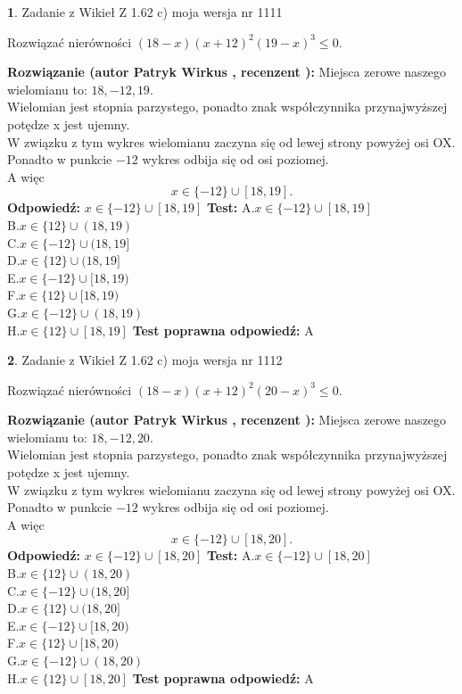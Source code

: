 \documentclass[12pt, a4paper]{article}
\theoremstyle{definition} %
\newtheorem{zad}{}
\newcommand{\zadStart}[1]{\begin{zad}#1\newline}
\newcommand{\zadStop}{\end{zad}}
\newcommand{\rozwStart}[2]{\noindent \textbf{Rozwiązanie (autor #1 , recenzent #2): }\newline}
\newcommand{\rozwStop}{\newline}
\newcommand{\odpStart}{\noindent \textbf{Odpowiedź:}\newline}
\newcommand{\odpStop}{\newline}
\newcommand{\testStart}{\noindent \textbf{Test:}\newline}
\newcommand{\testStop}{\newline}
\newcommand{\kluczStart}{\noindent \textbf{Test poprawna odpowiedź:}\newline}
\newcommand{\kluczStop}{\newline}
\begin{document}
\zadStart{Zadanie z Wikieł Z 1.62 c) moja wersja nr 1111}

Rozwiązać nierówności $(18-x)(x+12)^{2}(19-x)^{3}\le0$.
\zadStop
\rozwStart{Patryk Wirkus}{}
Miejsca zerowe naszego wielomianu to: $18, -12, 19$.\\
Wielomian jest stopnia parzystego, ponadto znak współczynnika przy\linebreak najwyższej potędze x jest ujemny.\\ W związku z tym wykres wielomianu zaczyna się od lewej strony powyżej osi OX.\\
Ponadto w punkcie $-12$ wykres odbija się od osi poziomej.\\
A więc $$x \in \{-12\} \cup [18,19].$$
\rozwStop
\odpStart
$x \in \{-12\} \cup [18,19]$
\odpStop
\testStart
A.$x \in \{-12\} \cup [18,19]$\\
B.$x \in \{12\} \cup (18,19)$\\
C.$x \in \{-12\} \cup (18,19]$\\
D.$x \in \{12\} \cup (18,19]$\\
E.$x \in \{-12\} \cup [18,19)$\\
F.$x \in \{12\} \cup [18,19)$\\
G.$x \in \{-12\} \cup (18,19)$\\
H.$x \in \{12\} \cup [18,19]$
\testStop
\kluczStart
A
\kluczStop



\zadStart{Zadanie z Wikieł Z 1.62 c) moja wersja nr 1112}

Rozwiązać nierówności $(18-x)(x+12)^{2}(20-x)^{3}\le0$.
\zadStop
\rozwStart{Patryk Wirkus}{}
Miejsca zerowe naszego wielomianu to: $18, -12, 20$.\\
Wielomian jest stopnia parzystego, ponadto znak współczynnika przy\linebreak najwyższej potędze x jest ujemny.\\ W związku z tym wykres wielomianu zaczyna się od lewej strony powyżej osi OX.\\
Ponadto w punkcie $-12$ wykres odbija się od osi poziomej.\\
A więc $$x \in \{-12\} \cup [18,20].$$
\rozwStop
\odpStart
$x \in \{-12\} \cup [18,20]$
\odpStop
\testStart
A.$x \in \{-12\} \cup [18,20]$\\
B.$x \in \{12\} \cup (18,20)$\\
C.$x \in \{-12\} \cup (18,20]$\\
D.$x \in \{12\} \cup (18,20]$\\
E.$x \in \{-12\} \cup [18,20)$\\
F.$x \in \{12\} \cup [18,20)$\\
G.$x \in \{-12\} \cup (18,20)$\\
H.$x \in \{12\} \cup [18,20]$
\testStop
\kluczStart
A
\kluczStop
\end{document}
